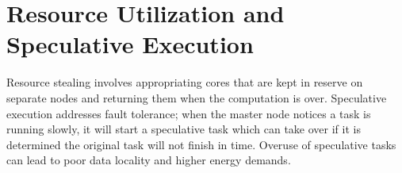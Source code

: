\section{Resource Utilization and Speculative Execution}

Resource stealing involves appropriating cores that are kept in reserve
on separate nodes and returning them when the computation is over.
Speculative execution addresses fault tolerance; when the master node
notices a task is running slowly, it will start a speculative task which
can take over if it is determined the original task will not finish in
time. Overuse of speculative tasks can lead to poor data locality and
higher energy demands.



